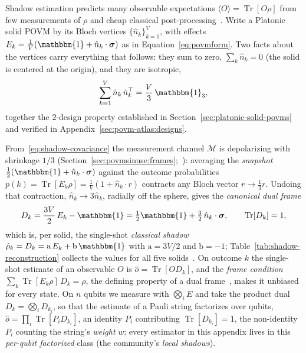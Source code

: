 \documentclass[11pt, oneside, openany]{scrbook}
\DeclareMathOperator{\Tr}{Tr}
\newcommand{\Id}{\mathbbm{1}}
\newcommand{\sigmavec}{\boldsymbol{\sigma}}
\begin{document}
Shadow estimation predicts many observable expectations $\langle O\rangle = \Tr[O\rho]$ from few measurements of $\rho$ and cheap classical post-processing~\cite{huang2020predictingmanyproperties, acharya2021informationallycompletepovmbased}. Write a Platonic solid POVM by its Bloch vertices $\{\hat n_k\}_{k=1}^V$, with effects $E_k = \frac{1}{V}(\Id + \hat n_k \cdot \sigmavec)$ as in Equation~\eqref{eq:povmform}. Two facts about the vertices carry everything that follows: they sum to zero, $\sum_k \hat n_k = 0$ (the solid is centered at the origin), and they are isotropic,
\begin{equation} \label{eq:shadow-covariance}
  \sum_{k=1}^V \hat n_k\, \hat n_k^\top = \frac{V}{3}\, \Id_3,
\end{equation}
together the $2$-design property established in Section~\ref{sec:platonic-solid-povms} and verified in Appendix~\ref{sec:povm-atlas:designs}.

From~\eqref{eq:shadow-covariance} the measurement channel $\mathcal M$ is depolarizing with shrinkage $1/3$ (Section~\ref{sec:povmsinuse:frames};~\cite{nguyen2022optimisingshadowtomography}): averaging the \textit{snapshot} $\frac12(\Id + \hat n_k \cdot \sigmavec)$ against the outcome probabilities $p(k) = \Tr[E_k \rho] = \frac1V(1 + \hat n_k \cdot r)$ contracts any Bloch vector $r \to \frac13 r$. Undoing that contraction, $\hat n_k \to 3\hat n_k$, radially off the sphere, gives the \textit{canonical dual frame}
\begin{equation*}
  D_k = \frac{3V}{2}\, E_k - \Id = \tfrac12 \Id + \tfrac32\, \hat n_k \cdot \sigmavec, \qquad \Tr[D_k] = 1,
\end{equation*}
which is, per solid, the single-shot \textit{classical shadow} $\hat\rho_k = D_k = \mathrm a\, E_k + \mathrm b\,\Id$ with $\mathrm a = 3V/2$ and $\mathrm b = -1$; Table~\ref{tab:shadow-reconstruction} collects the values for all five solids~\cite{nguyen2022optimisingshadowtomography, nguyen2020symmetriesmeasurementsquantum}. On outcome $k$ the single-shot estimate of an observable $O$ is $\hat o = \Tr[O D_k]$, and the \textit{frame condition} $\sum_k \Tr[E_k \rho]\, D_k = \rho$, the defining property of a dual frame~\cite{innocenti2023shadowtomographygeneral, christensen2016introductionframesriesz}, makes it unbiased for every state. On $n$ qubits we measure with $\bigotimes_i E$ and take the product dual $D_k = \bigotimes_i D_{k_i}$, so that the estimate of a Pauli string factorizes over qubits, $\hat o = \prod_i \Tr[P_i D_{k_i}]$, an identity $P_i$ contributing $\Tr[D_{k_i}] = 1$, the non-identity $P_i$ counting the string's \textit{weight} $w$: every estimator in this appendix lives in this \textit{per-qubit factorized} class (the community's \textit{local shadows}).
\end{document}
